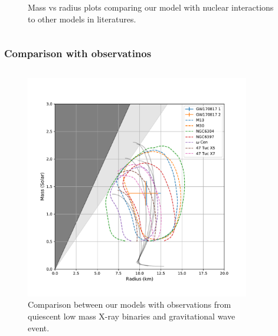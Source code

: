 \documentclass[hperref={pdfpagelabels=false}]{beamer}
\begin{document}
\begin{frame}
\begin{columns}
\begin{column}{0.48\textwidth}
\begin{figure}
    \caption{Mass vs radius plots comparing our model with nuclear interactions to other models in literatures.}
  \end{figure}
  \end{column}
 \end{columns}
\end{frame}

\begin{frame}
 \frametitle{Comparison with observatinos}
 \begin{columns}
  \begin{column}{0.48\textwidth}
  \begin{figure}
    \includegraphics[scale=0.3]{eos_compare_obsv1_GW.pdf}
    \caption{Comparison between our models with observations from quiescent low mass X-ray binaries and gravitational wave event.}
  \end{figure}
  \end{column}
  \begin{column}{0.48\textwidth}
  \begin{figure}

\end{figure}
\end{column}
\end{columns}
\end{frame}
\end{document}
